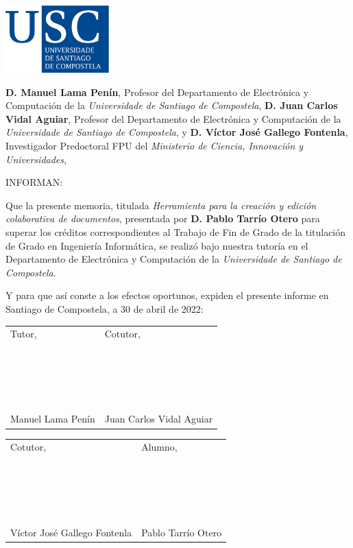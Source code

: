 \pagestyle{plain}
\includegraphics[width=4cm]{figuras/logo_usc.eps}

\vspace{1cm}
{\bf D. Manuel Lama Penín}, Profesor del Departamento de Electrónica y Computación de la {\it Universidade de Santiago de Compostela}, {\bf D. Juan Carlos Vidal Aguiar}, Profesor del Departamento de Electrónica y Computación de la {\it Universidade de Santiago de Compostela}, y {\bf D. Víctor José Gallego Fontenla}, Investigador Predoctoral FPU del {\it Ministerio de Ciencia, Innovación y Universidades},

\vspace{1cm}
INFORMAN:

\vspace{1cm}
Que la presente memoria, titulada {\it Herramienta para la creación y edición
colaborativa de documentos}, presentada por {\bf D. Pablo Tarrío Otero} para superar los créditos correspondientes al Trabajo de Fin de Grado de la titulación de Grado en Ingeniería Informática, se realizó bajo nuestra tutoría en el Departamento de Electrónica y Computación de la {\it Universidade de Santiago de Compostela}.

\vspace{1cm}
Y para que así conste a los efectos oportunos, expiden el presente informe en Santiago de Compostela, a 30 de abril de 2022:

\vspace{0.5cm}
\begin{tabular}{ll}
	Tutor, & \hspace{3.6cm} Cotutor, \\
	~ \\
	~ \\
	~ \\
	~ \\
	Manuel Lama Penín & \hspace{3.6cm} Juan Carlos Vidal Aguiar
\end{tabular}

\vspace{1cm}
\begin{tabular}{ll}
	Cotutor, & \hspace{2cm} Alumno, \\
	~ \\
	~ \\
	~ \\
	~ \\
	Víctor José Gallego Fontenla & \hspace{2cm} Pablo Tarrío Otero
\end{tabular}

